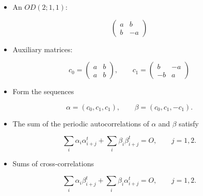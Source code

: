 \documentclass{beamer}
\begin{document}
\begin{frame}

  \begin{itemize}
    \item An $OD(2;1,1)$:
  \end{itemize}

  \[
    \begin{pmatrix}
      a & b \\ b & -a
    \end{pmatrix}
  \]

  \begin{itemize}
    \item Auxiliary matrices:
  \end{itemize}

  \[
    c_0=
    \begin{pmatrix}
      a & b \\ a & b
    \end{pmatrix}, \qquad
    c_1=
    \begin{pmatrix}
      b & -a \\ -b & a
    \end{pmatrix}
  \]
 
\end{frame}

\begin{frame}

  \begin{itemize}
    \item Form the sequences
  \end{itemize}

  $$
  \alpha = (c_0,c_1,c_1), \qquad \beta = (c_0,c_1,-c_1).
  $$

  \begin{itemize}
    \item The sum of the periodic autocorrelations of $\alpha$ and $\beta$ satisfy
  \end{itemize}

  $$
  \sum_i \alpha_i\alpha_{i+j}^t + \sum_i \beta_i\beta_{i+j}^t = O, \qquad j=1,2.
  $$

  \begin{itemize}
    \item Sums of cross-correlations
  \end{itemize}

  $$
  \sum_i \alpha_i\beta_{i+j}^t + \sum_i \beta_i\alpha_{i+j}^t = O, \qquad j=1,2.
  $$

\end{frame}
\end{document}
